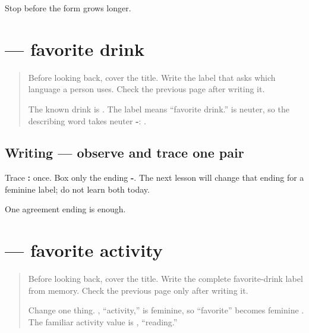 \begin{tcolorbox}[breakable,colback=teal!4,colframe=teal!35!black,title={Before you move on}]
Stop before the form grows longer.
\end{tcolorbox}
\section[\texorpdfstring{\mr{आवडते} \mr{पेय}: \mr{चहा} (āvaḍte pey: chahā)}{आवडते पेय: चहा (āvaḍte pey: chahā)}]{  — favorite drink}

\label{lesson:MR-A1F01-avdate-pey}



\begin{quote}
Before looking back, cover the title. Write the label that asks which language a person uses. Check the previous page after writing it.

The known drink is \textbf{}. The label \textbf{ } means “favorite drink.” \textbf{} is neuter, so the describing word takes neuter \textbf{-}: \textbf{}.
\end{quote}

\subsection*{Writing — observe and trace one pair}
Trace \textbf{ : } once. Box only the ending \textbf{-}. The next lesson will change that ending for a feminine label; do not learn both today.

\begin{tcolorbox}[breakable,colback=teal!4,colframe=teal!35!black,title={Before you move on}]
One agreement ending is enough.
\end{tcolorbox}
\section[\texorpdfstring{\mr{आवडती} \mr{कृती}: \mr{वाचणे} (āvaḍtī kṛtī: vācaṇe)}{आवडती कृती: वाचणे (āvaḍtī kṛtī: vācaṇe)}]{  — favorite activity}

\label{lesson:MR-A1F01-avadti-kruti}



\begin{quote}
Before looking back, cover the title. Write the complete favorite-drink label from memory. Check the previous page only after writing it.

Change one thing. \textbf{}, “activity,” is feminine, so “favorite” becomes feminine \textbf{}. The familiar activity value is \textbf{}, “reading.”
\end{quote}

